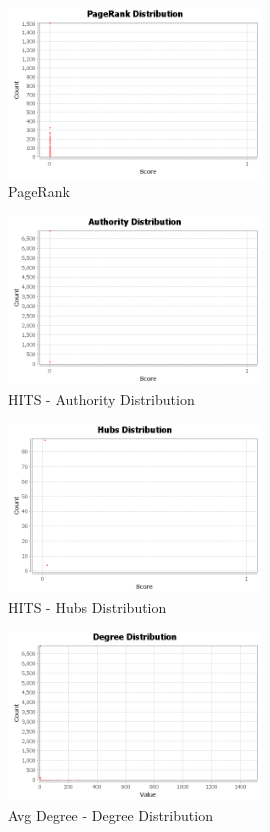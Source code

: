 \documentclass[letterpaper,11pt]{report}
\begin{document}
\begin{savenotes}
\begin{figure}[htbp]
	\centering
		\includegraphics[width=0.60\textwidth]{pageranks.png}
	\caption{PageRank}
	\label{fig:pageranks}
\end{figure}

\begin{figure}[htbp]
	\centering
		\includegraphics[width=0.60\textwidth]{authorities.png}
	\caption{HITS - Authority Distribution}
	\label{fig:authorities}
\end{figure}

\begin{figure}
	\centering
		\includegraphics[width=0.60\textwidth]{hubs.png}
	\caption{HITS - Hubs Distribution}
	\label{fig:hubs}
\end{figure}

\begin{figure}[htbp]
	\centering
		\includegraphics[width=0.60\textwidth]{DegreeDistribution.png}
	\caption{Avg Degree - Degree Distribution}
	\label{fig:DegreeDistribution}
\end{figure}



\end{savenotes}
\end{document}
